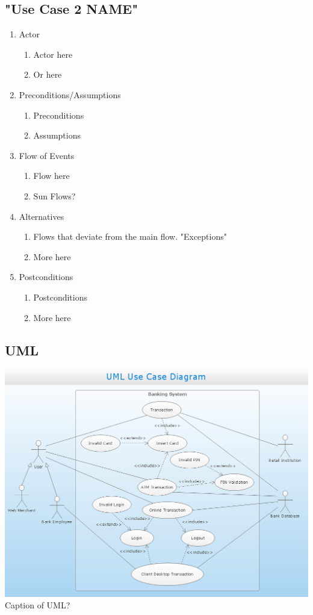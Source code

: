 \documentclass[12pt]{article}
\begin{document}
	\subsection{"Use Case 2 NAME"}
\begin{enumerate}
  \item Actor
  \begin{enumerate}
  		\item Actor here
   		 \item Or here
  \end{enumerate}
  \item Preconditions/Assumptions
  \begin{enumerate}
   		 \item Preconditions 
   		 \item Assumptions
  \end{enumerate}
  \item Flow of Events
  \begin{enumerate}
   		 \item Flow here
   		 \item Sun Flows?
  \end{enumerate}
  \item Alternatives
  \begin{enumerate}
    		\item Flows that deviate from the main flow. "Exceptions"
    		\item More here
  \end{enumerate}
  \item  Postconditions
  \begin{enumerate}
    		\item Postconditions
    		\item More here
  \end{enumerate}
\end{enumerate}

\subsection{UML}
\includegraphics[scale=.5]{EXAMPLEUML.png}
Caption of UML? 
\end{document}
